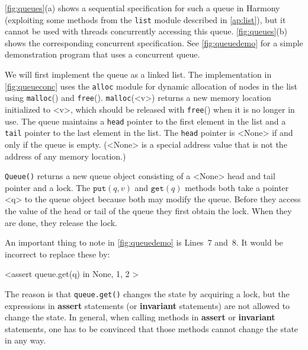 \documentclass{report}
\newenvironment{code}{
\tcolorbox
}{
\endtcolorbox
}
\begin{document}
\noindent
\autoref{fig:queues}(a) shows a sequential specification for such a
queue in Harmony (exploiting some methods from the \texttt{list}
module described in \autoref{ap:list}),
but it cannot be used with threads concurrently accessing this queue.
\autoref{fig:queues}(b) shows the corresponding concurrent specification.
See \autoref{fig:queuedemo} for a simple demonstration program that uses
a concurrent queue.

We will first implement the queue as a linked list.
The implementation in \autoref{fig:queueconc}
uses the \texttt{alloc} module for dynamic allocation
%
of nodes in the list using \texttt{malloc}() and \texttt{free}().
\texttt{malloc}(<{v}>) returns a new memory location initialized to <{v}>,
which should be released with \texttt{free}() when it is no longer in use.
The queue maintains a \texttt{head} pointer to the first element in the list
and a \texttt{tail} pointer to the last element in the list.
The \texttt{head} pointer is <{None}> if and only if the queue is empty.
(<{None}> is a special address value that is not the address of any
memory location.)

\texttt{Queue()} returns a new queue object consisting of a <{None}> head
and tail pointer and a lock.
The $\mathtt{put}(q, v)$ and $\mathtt{get}(q)$ methods both take a pointer <{q}> to the
queue object because both may modify the queue.
Before they access the value of the head or tail of the queue they first obtain
the lock.
When they are done, they release the lock.

An important thing to note in \autoref{fig:queuedemo}
is Lines~7 and~8.
It would be incorrect to replace these by:

\begin{code}
<{assert queue.get(q) in { None, 1, 2 }}>
\end{code}

The reason is that \texttt{queue.get()} changes the state by
acquiring a lock, but the expressions in \textbf{assert}
statements (or \textbf{invariant} statements)
are not allowed to change the state.
In general, when calling methods in \textbf{assert} or
\textbf{invariant} statements, one has to be convinced that
those methods cannot change the state in any way.
\end{document}
